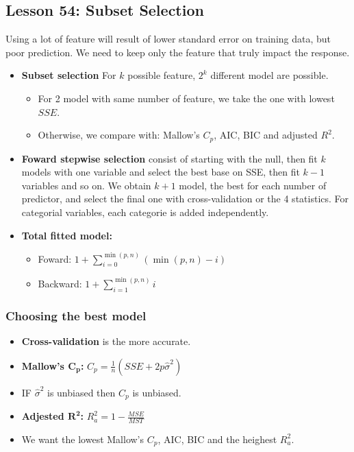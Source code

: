\documentclass[10pt, french]{article}
\begin{document}
\begin{multicols*}{3}
\section*{Lesson 54: Subset Selection}
Using a lot of feature will result of lower standard error on training data, but poor prediction. We need to keep only the feature that truly impact the response.
\begin{itemize}[align=left,leftmargin=*]
   \item \textbf{Subset selection} For $k$ possible feature, $2^k$ different model are possible.
   \begin{itemize}
    \item For 2 model with same number of feature, we take the one with lowest $SSE$.
    \item Otherwise, we compare with: Mallow's $C_p$, AIC, BIC and adjusted $R^2$.
   \end{itemize}
   \item \textbf{Foward stepwise selection} consist of starting with the null, then fit $k$ models with one variable and select the best base on SSE, then fit $k-1$ variables and so on. We obtain $k+1$ model, the best for each number of predictor, and select the final one with cross-validation or the 4 statistics. For categorial variables, each categorie is added independently.
   \item \textbf{Total fitted model:}
   \begin{itemize}
      \item Foward: $1 + \sum\limits_{i=0}^{\min(p,n)} (\min(p,n) - i)$
      \item Backward: $1 + \sum\limits_{i=1}^{\min(p,n)} i$
   \end{itemize}
\end{itemize}
\subsubsection*{Choosing the best model}
\begin{itemize}
   \item \textbf{Cross-validation} is the more accurate.
   \item \textbf{Mallow's $\mathbf{C_p}$:} $C_p = \frac{1}{n}(SSE + 2p\hat{\sigma}^2)$
   \item[] IF $\hat{\sigma}^2$ is unbiased then $C_p$ is unbiased.
   \item \textbf{Adjested $\mathbf{R^2}$:} $R_a^2 = 1 -  \frac{MSE}{MST}$
   \item We want the lowest Mallow's $C_p$, AIC, BIC and the heighest $R_a^2$.
\end{itemize}


\end{multicols*}
\end{document}

